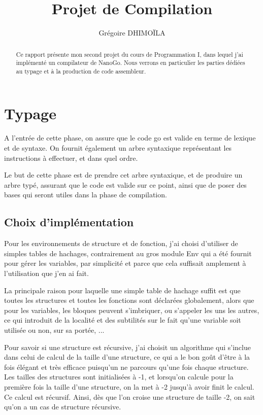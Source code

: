 \documentclass{article}
\title{Projet de Compilation}
\author{Grégoire DHIMOÏLA}
\begin{document}
\maketitle

\begin{abstract}
Ce rapport présente mon second projet du cours de Programmation I, dans lequel j'ai implémenté un compilateur de NanoGo. Nous verrons en particulier les parties dédiées au typage et à la production de code assembleur.
\end{abstract}

\section{Typage}

A l'entrée de cette phase, on assure que le code go est valide en terme de lexique et de syntaxe. On fournit également un arbre syntaxique représentant les instructions à effectuer, et dans quel ordre.

Le but de cette phase est de prendre cet arbre syntaxique, et de produire un arbre typé, assurant que le code est valide sur ce point, ainsi que de poser des bases qui seront utiles dans la phase de compilation. 

\subsection{Choix d'implémentation}

Pour les environnements de structure et de fonction, j'ai choisi d'utiliser de simples tables de hachages, contrairement au gros module Env qui a été fournit pour gérer les variables, par simplicité et parce que cela suffisait amplement à l'utilisation que j'en ai fait.

La principale raison pour laquelle une simple table de hachage suffit est que toutes les structures et toutes les fonctions sont déclarées globalement, alors que pour les variables, les bloques peuvent s'imbriquer, ou s'appeler les uns les autres, ce qui introduit de la localité et des subtilités sur le fait qu'une variable soit utilisée ou non, sur sa portée, ...\newline

Pour savoir si une structure est récursive, j'ai choisit un algorithme qui s'inclue dans celui de calcul de la taille d'une structure, ce qui a le bon goût d'être à la fois élégant et très efficace puisqu'un ne parcours qu'une fois chaque structure. Les tailles des structures sont initialisées à -1, et lorsqu'on calcule pour la première fois la taille d'une structure, on la met à -2 jusqu'à avoir finit le calcul. Ce calcul est récursif. Ainsi, dès que l'on croise une structure de taille -2, on sait qu'on a un cas de structure récursive.
\end{document}
